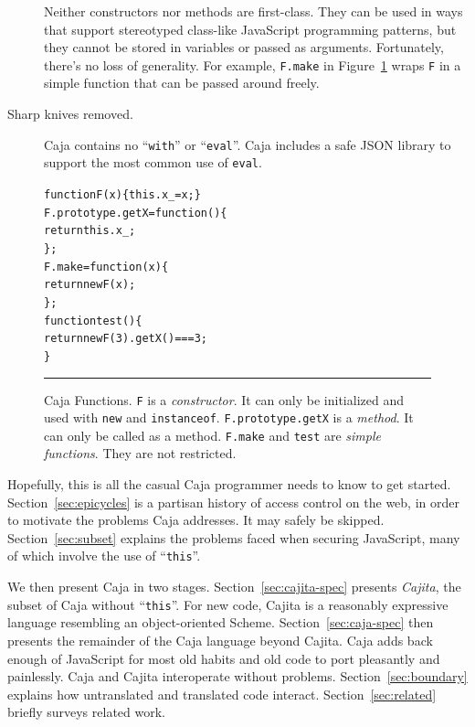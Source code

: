\documentclass[letterpaper,twocolumn,10pt]{article}
\newcommand{\code}[1]{{\tt {#1}}}              %
\begin{document}
\begin{description}
  Neither constructors nor methods are first-class. They can be used in ways 
  that support stereotyped class-like JavaScript programming patterns, but 
  they cannot be stored in variables or passed as arguments. Fortunately, 
  there's no loss of generality. For example, \code{F.make} in 
  Figure~\ref{fig:func-obj} wraps \code{F} in a simple function that can be 
  passed around freely.
 
  \item[Sharp knives removed.] Caja contains no ``\code{with}'' or 
  ``\code{eval}''. Caja includes a safe JSON library to support the most 
  common use of \code{eval}.
 
\end{description}

\begin{figure}[t!]
\begin{alltt}
function F(x) \{ this.x_ = x; \}
F.prototype.getX = function() \{
  return this.x_;
\};
F.make = function(x) \{
  return new F(x);
\};
function test() \{
  return new F(3).getX() === 3;
\}
\end{alltt}

\caption[Caja Functions]{Caja Functions. \code{F} is a \emph{constructor}. It 
can only be initialized and used with \code{new} and \code{instanceof}. 
\code{F.prototype.getX} is a \emph{method}. It can only be called as a 
method. \code{F.make} and \code{test} are \emph{simple functions}. They are
not restricted. \\ } \hrule
\label{fig:func-obj}
\end{figure}

Hopefully, this is all the casual Caja programmer needs to know to get 
started. Section~\ref{sec:epicycles} is a partisan history of access control 
on the web, in order to motivate the problems Caja addresses. It may safely 
be skipped. Section~\ref{sec:subset} explains the problems faced when 
securing JavaScript, many of which involve the use of ``\code{this}''.

We then present Caja in two stages. Section~\ref{sec:cajita-spec} presents 
\emph{Cajita}, the subset of Caja without ``\code{this}''. For new code, 
Cajita is a reasonably expressive language resembling an object-oriented 
Scheme. Section~\ref{sec:caja-spec} then presents the remainder of the Caja 
language beyond Cajita. Caja adds back enough of JavaScript for most old 
habits and old code to port pleasantly and painlessly. Caja and Cajita 
interoperate without problems. Section~\ref{sec:boundary} explains how 
untranslated and translated code interact. Section~\ref{sec:related} briefly 
surveys related work.
\end{document}
